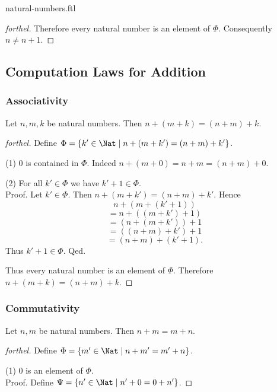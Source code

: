 \documentclass{naproche-library}
\begin{document}
\begin{smodule}{natural-numbers.ftl}
\begin{proof}[forthel]
    Therefore every natural number is an element of $\Phi$.
    Consequently $n \neq n + 1$.
  \end{proof}


  \subsection*{Computation Laws for Addition}

  \subsubsection*{Associativity}

  \begin{proposition}[forthel,id=ARITHMETIC_03_3235893452210176]
    Let $n, m, k$ be natural numbers.
    Then $n + (m + k) = (n + m) + k$.
  \end{proposition}
  \begin{proof}[forthel]
    Define $\Phi = \{ k' \in \Nat \mid n + (m + k') = (n + m) + k' \}$.

    (1) $0$ is contained in $\Phi$.
    Indeed $n + (m + 0) = n + m = (n + m) + 0$.

    (2) For all $k' \in \Phi$ we have $k' + 1 \in \Phi$. \\
    Proof.
      Let $k' \in \Phi$.
      Then $n + (m + k') = (n + m) + k'$.
      Hence
      \[  n + (m + (k' + 1))        \]
      \[    = n + ((m + k') + 1)    \]
      \[    = (n + (m + k')) + 1    \]
      \[    = ((n + m) + k') + 1    \]
      \[    = (n + m) + (k' + 1).   \]
      Thus $k' + 1 \in \Phi$.
    Qed.

    Thus every natural number is an element of $\Phi$.
    Therefore $n + (m + k) = (n + m) + k$.
  \end{proof}


  \subsubsection*{Commutativity}

  \begin{proposition}[forthel,id=ARITHMETIC_03_4029553232052224]
    Let $n, m$ be natural numbers.
    Then $n + m = m + n$.
  \end{proposition}
  \begin{proof}[forthel]
    Define $\Phi = \{ m' \in \Nat \mid n + m' = m' + n \}$.

    (1) $0$ is an element of $\Phi$. \\
    Proof.
      Define $\Psi = \{ n' \in \Nat \mid n' + 0 = 0 + n' \}$.


\end{proof}
\end{smodule}
\end{document}

